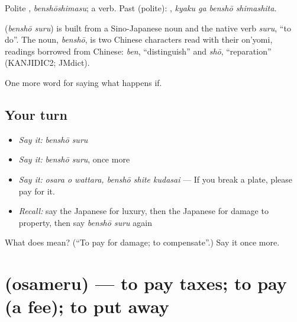 Polite \textbf{}, \emph{benshōshimasu}; a  verb. Past (polite): \textbf{ }, \emph{kyaku ga benshō shimashita}.

\begin{cousinweb}
\textbf{} (\emph{benshō suru}) is built from a Sino-Japanese noun and the native verb \emph{suru}, \textquotedblleft{}to do\textquotedblright{}. The noun, \emph{benshō}, is two Chinese characters read with their on'yomi, readings borrowed from Chinese: \emph{ben}, \textquotedblleft{}distinguish\textquotedblright{} and \emph{shō}, \textquotedblleft{}reparation\textquotedblright{} (KANJIDIC2; JMdict).
\end{cousinweb}

\begin{grammarlens}[title={What you've built}]
One more word for saying what happens if.
\end{grammarlens}

\subsection*{Your turn}
\begin{itemize}
\raggedright
  \item \emph{Say it:} \emph{benshō suru}
  \item \emph{Say it:} \emph{benshō suru}, once more
  \item \emph{Say it:} \emph{osara o wattara, benshō shite kudasai} — If you break a plate, please pay for it.
  \item \emph{Recall:} say the Japanese for luxury, then the Japanese for damage to property, then say \emph{benshō suru} again
\end{itemize}

\begin{tcolorbox}[breakable,colback=teal!4,colframe=teal!35!black,title={Before you move on}]
What does  mean? (\textquotedblleft{}To pay for damage; to compensate\textquotedblright{}.) Say it once more.
\end{tcolorbox}
\section[\texorpdfstring{\ja{おさめる} (osameru)}{おさめる (osameru)}]{ (osameru) — to pay taxes; to pay (a fee); to put away}

\label{lesson:JA-C364-osameru}



